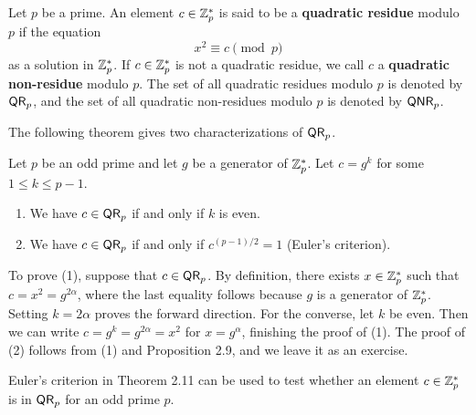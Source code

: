 \begin{defn}
Let $p$ be a prime. An element $c \in \mathbb{Z}_p^*$ is said to be a {\bf quadratic residue} modulo $p$ if 
the equation 
\[ x^2 \equiv c \pmod p \]
as a solution in $\mathbb{Z}_p^*$. If $c \in \mathbb{Z}_p^*$ is not a quadratic residue, we call $c$ a 
{\bf quadratic non-residue} modulo $p$. The set of all quadratic residues modulo $p$ is denoted by 
$\QR_p$, and the set of all quadratic non-residues modulo $p$ is denoted by ${\sf QNR}_p$. 
\end{defn}

The following theorem gives two characterizations of $\QR_p$. 

\begin{thm}[Characterizations of $\QR_p$]
Let $p$ be an odd prime and let $g$ be a generator of $\mathbb{Z}_p^*$. Let $c = g^k$ for some $1 \leq k 
\leq p-1$.
\begin{enumerate}[(1)]
    \item We have $c \in {\sf QR}_p$ if and only if $k$ is even. 
    \item We have $c \in {\sf QR}_p$ if and only if $c^{(p-1)/2} = 1$ (Euler's criterion). 
\end{enumerate}
\end{thm}
\begin{pf}
To prove (1), suppose that $c \in {\sf QR}_p$. By definition, there exists $x \in \mathbb{Z}_p^*$ such that 
$c = x^2 = g^{2\alpha}$, where the last equality follows because $g$ is a generator of 
$\mathbb{Z}_p^*$. Setting $k = 2\alpha$ proves the forward direction. For the converse, let $k$ be even. 
Then we can write $c = g^k = g^{2\alpha} = x^2$ for $x = g^\alpha$, finishing the proof of (1). 
The proof of (2) follows from (1) and Proposition 2.9, and we leave it as an exercise.
\end{pf}

Euler's criterion in Theorem 2.11 can be used to test whether an element $c \in \mathbb{Z}_p^*$ 
is in $\QR_p$ for an odd prime $p$. 